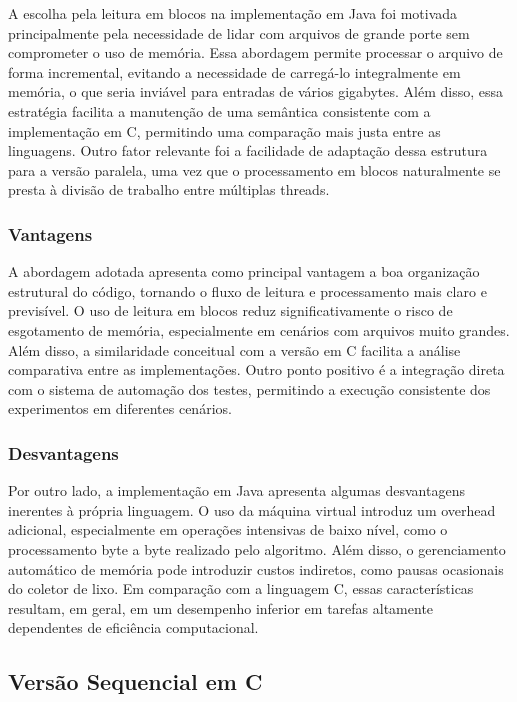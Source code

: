 \documentclass[10pt,twocolumn,a4paper]{article}
\begin{document}
A escolha pela leitura em blocos na implementação em Java foi motivada principalmente pela necessidade de lidar com arquivos de grande porte sem comprometer o uso de memória. Essa abordagem permite processar o arquivo de forma incremental, evitando a necessidade de carregá-lo integralmente em memória, o que seria inviável para entradas de vários gigabytes. Além disso, essa estratégia facilita a manutenção de uma semântica consistente com a implementação em C, permitindo uma comparação mais justa entre as linguagens. Outro fator relevante foi a facilidade de adaptação dessa estrutura para a versão paralela, uma vez que o processamento em blocos naturalmente se presta à divisão de trabalho entre múltiplas threads.

\subsubsection{Vantagens}

A abordagem adotada apresenta como principal vantagem a boa organização estrutural do código, tornando o fluxo de leitura e processamento mais claro e previsível. O uso de leitura em blocos reduz significativamente o risco de esgotamento de memória, especialmente em cenários com arquivos muito grandes. Além disso, a similaridade conceitual com a versão em C facilita a análise comparativa entre as implementações. Outro ponto positivo é a integração direta com o sistema de automação dos testes, permitindo a execução consistente dos experimentos em diferentes cenários.

\subsubsection{Desvantagens}

Por outro lado, a implementação em Java apresenta algumas desvantagens inerentes à própria linguagem. O uso da máquina virtual introduz um overhead adicional, especialmente em operações intensivas de baixo nível, como o processamento byte a byte realizado pelo algoritmo. Além disso, o gerenciamento automático de memória pode introduzir custos indiretos, como pausas ocasionais do coletor de lixo. Em comparação com a linguagem C, essas características resultam, em geral, em um desempenho inferior em tarefas altamente dependentes de eficiência computacional.

\subsection{Versão Sequencial em C}
\end{document}
